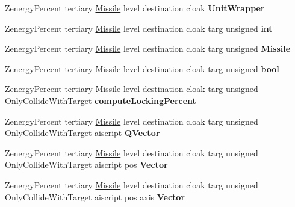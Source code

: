 \begin{DoxyCompactItemize}
\item 
Zenergy\+Percent tertiary \hyperlink{classMissile}{Missile} level destination cloak {\bfseries Unit\+Wrapper}\hypertarget{classUnitWrapper_a7f0f5fcad45ad832619895ec7a70fa59}{}\label{classUnitWrapper_a7f0f5fcad45ad832619895ec7a70fa59}

\item 
Zenergy\+Percent tertiary \hyperlink{classMissile}{Missile} level destination cloak targ unsigned {\bfseries int}\hypertarget{classUnitWrapper_a823fc38b6554d478c83009e771cb4a0d}{}\label{classUnitWrapper_a823fc38b6554d478c83009e771cb4a0d}

\item 
Zenergy\+Percent tertiary \hyperlink{classMissile}{Missile} level destination cloak targ unsigned {\bfseries Missile}\hypertarget{classUnitWrapper_af806dacd2be1b7e8e0d1dbfd0d484ffa}{}\label{classUnitWrapper_af806dacd2be1b7e8e0d1dbfd0d484ffa}

\item 
Zenergy\+Percent tertiary \hyperlink{classMissile}{Missile} level destination cloak targ unsigned {\bfseries bool}\hypertarget{classUnitWrapper_a6efc1b23e80a3e02be4a6a44569167f7}{}\label{classUnitWrapper_a6efc1b23e80a3e02be4a6a44569167f7}

\item 
Zenergy\+Percent tertiary \hyperlink{classMissile}{Missile} level destination cloak targ unsigned Only\+Collide\+With\+Target {\bfseries compute\+Locking\+Percent}\hypertarget{classUnitWrapper_a3fd7f2aad8e2e76450ac41c6007b42c7}{}\label{classUnitWrapper_a3fd7f2aad8e2e76450ac41c6007b42c7}

\item 
Zenergy\+Percent tertiary \hyperlink{classMissile}{Missile} level destination cloak targ unsigned Only\+Collide\+With\+Target aiscript {\bfseries Q\+Vector}\hypertarget{classUnitWrapper_af9d8fdb0e28dbb1b34491dbac34e16f4}{}\label{classUnitWrapper_af9d8fdb0e28dbb1b34491dbac34e16f4}

\item 
Zenergy\+Percent tertiary \hyperlink{classMissile}{Missile} level destination cloak targ unsigned Only\+Collide\+With\+Target aiscript pos {\bfseries Vector}\hypertarget{classUnitWrapper_a7bab25b85c9c2d282eafa1d3a2140f6c}{}\label{classUnitWrapper_a7bab25b85c9c2d282eafa1d3a2140f6c}

\item 
Zenergy\+Percent tertiary \hyperlink{classMissile}{Missile} level destination cloak targ unsigned Only\+Collide\+With\+Target aiscript pos axis {\bfseries Vector}\hypertarget{classUnitWrapper_a4a9974f76de6752fae54ad16170f3a25}{}\label{classUnitWrapper_a4a9974f76de6752fae54ad16170f3a25}


\end{DoxyCompactItemize}
